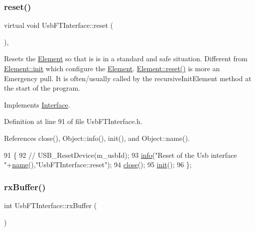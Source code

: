 \subsubsection{\texorpdfstring{reset()}{reset()}}
{\footnotesize\ttfamily virtual void Usb\+F\+T\+Interface\+::reset (\begin{DoxyParamCaption}{ }\end{DoxyParamCaption})\hspace{0.3cm}{\ttfamily [inline]}, {\ttfamily [virtual]}}

Resets the \hyperlink{classElement}{Element} so that is is in a standard and safe situation. Different from \hyperlink{classElement_af42754b5cabc198869222725218d695c}{Element\+::init} which configure the \hyperlink{classElement}{Element}. \hyperlink{classElement_a69efffa22f06909d768149715565cb56}{Element\+::reset()} is more an Emergency pull. It is often/usually called by the recursive\+Init\+Element method at the start of the program. 

Implements \hyperlink{classInterface_a4d44329cea9981a9e0392eaaf99efadd}{Interface}.



Definition at line 91 of file Usb\+F\+T\+Interface.\+h.



References close(), Object\+::info(), init(), and Object\+::name().


\begin{DoxyCode}
91                        \{
92     \textcolor{comment}{//    USB\_ResetDevice(m\_usbId);}
93     \hyperlink{classObject_a644fd329ea4cb85f54fa6846484b84a8}{info}(\textcolor{stringliteral}{"Reset of the Usb interface "}+\hyperlink{classObject_a300f4c05dd468c7bb8b3c968868443c1}{name}(),\textcolor{stringliteral}{"UsbFTInterface::reset"});
94     \hyperlink{classUsbFTInterface_ad555e20eb4b80da1d3cac5a8c6509bb5}{close}();
95     \hyperlink{classUsbFTInterface_a5371fe7b447850599eaec81a0ffa2ba0}{init}();
96   \};
\end{DoxyCode}
\mbox{\label{classUsbFTInterface_a836d1a8d181fd49e11235bb677e3fa7e}} 
\subsubsection{\texorpdfstring{rx\+Buffer()}{rxBuffer()}}
{\footnotesize\ttfamily int Usb\+F\+T\+Interface\+::rx\+Buffer (\begin{DoxyParamCaption}{ }\end{DoxyParamCaption})\hspace{0.3cm}{\ttfamily [inline]}}


